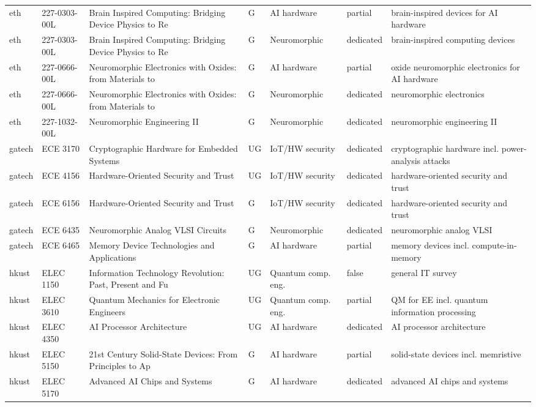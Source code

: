 \documentclass[10pt]{article}
\begin{document}
\begin{longtable}{@{}llL{4.6cm}llll@{}}
eth & 227-0303-00L & Brain Inspired Computing: Bridging Device Physics to Re & G & AI hardware & partial & brain-inspired devices for AI hardware \\
eth & 227-0303-00L & Brain Inspired Computing: Bridging Device Physics to Re & G & Neuromorphic & dedicated & brain-inspired computing devices \\
eth & 227-0666-00L & Neuromorphic Electronics with Oxides: from Materials to & G & AI hardware & partial & oxide neuromorphic electronics for AI hardware \\
eth & 227-0666-00L & Neuromorphic Electronics with Oxides: from Materials to & G & Neuromorphic & dedicated & neuromorphic electronics \\
eth & 227-1032-00L & Neuromorphic Engineering II & G & Neuromorphic & dedicated & neuromorphic engineering II \\
gatech & ECE 3170 & Cryptographic Hardware for Embedded Systems & UG & IoT/HW security & dedicated & cryptographic hardware incl. power-analysis attacks \\
gatech & ECE 4156 & Hardware-Oriented Security and Trust & UG & IoT/HW security & dedicated & hardware-oriented security and trust \\
gatech & ECE 6156 & Hardware-Oriented Security and Trust & G & IoT/HW security & dedicated & hardware-oriented security and trust \\
gatech & ECE 6435 & Neuromorphic Analog VLSI Circuits & G & Neuromorphic & dedicated & neuromorphic analog VLSI \\
gatech & ECE 6465 & Memory Device Technologies and Applications & G & AI hardware & partial & memory devices incl. compute-in-memory \\
hkust & ELEC 1150 & Information Technology Revolution: Past, Present and Fu & UG & Quantum comp. eng. & false & general IT survey \\
hkust & ELEC 3610 & Quantum Mechanics for Electronic Engineers & UG & Quantum comp. eng. & partial & QM for EE incl. quantum information processing \\
hkust & ELEC 4350 & AI Processor Architecture & UG & AI hardware & dedicated & AI processor architecture \\
hkust & ELEC 5150 & 21st Century Solid-State Devices: From Principles to Ap & G & AI hardware & partial & solid-state devices incl. memristive \\
hkust & ELEC 5170 & Advanced AI Chips and Systems & G & AI hardware & dedicated & advanced AI chips and systems \\

\end{longtable}
\end{document}
